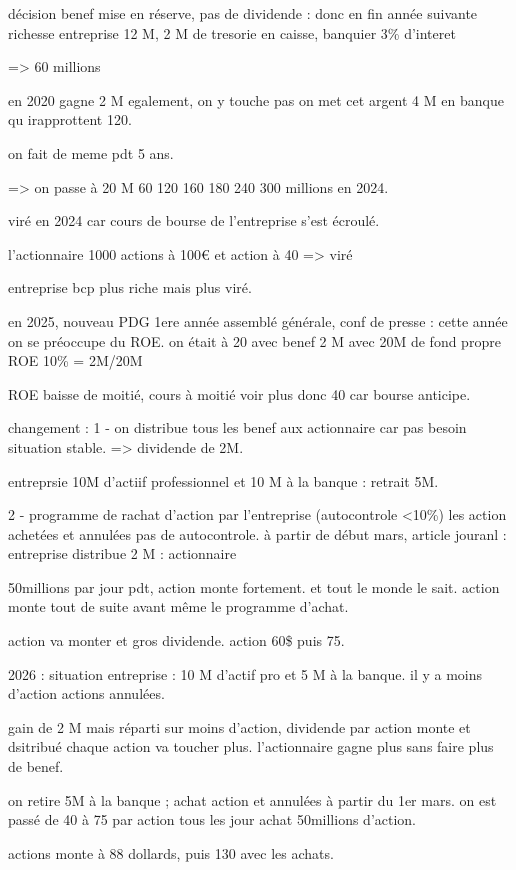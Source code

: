 \documentclass[a4paper,12pt]{article}
\begin{document}
décision benef mise en réserve, pas de dividende : donc en fin année suivante richesse
entreprise 12 M, 2 M de tresorie en caisse, banquier 3\% d'interet

=> 60 millions 

en 2020 gagne 2 M egalement, on y touche pas 
on met cet argent  4 M en banque qu irapprottent 120.

on fait de meme pdt 5 ans.

=> on passe à 20 M 60 120 160 180 240 300 millions en 2024.

viré en 2024 car cours de bourse de l'entreprise s'est écroulé.

l'actionnaire 1000 actions à 100€ et action à 40 => viré

entreprise bcp plus riche mais plus viré.

en 2025, nouveau PDG 1ere année
assemblé générale, conf de presse : cette année on se préoccupe du ROE.
on était à 20  avec benef 2 M avec 20M de fond propre  ROE 10\% = 2M/20M

ROE baisse de moitié, cours à moitié voir plus donc 40 car bourse anticipe.

changement : 1 - on distribue tous les benef aux actionnaire car pas besoin situation stable.
=> dividende de 2M.

entreprsie 10M d'actiif professionnel et 10 M à la banque : retrait 5M.

2 - programme de rachat d'action par l'entreprise  (autocontrole <10\%)
les action achetées et annulées pas de autocontrole. 
à partir de début mars, 
article jouranl : entreprise distribue 2 M : actionnaire 

50millions par jour pdt, action monte fortement. et tout le monde le sait.
action monte tout de suite avant même le programme d'achat.

action va monter et gros dividende.
action 60\$ puis 75.

2026 : situation entreprise : 10 M d'actif pro et 5 M à la banque.
il y a moins d'action actions annulées.

gain de 2 M mais réparti sur moins d'action, dividende par action monte et dsitribué
chaque action va toucher plus. l'actionnaire gagne plus sans faire plus de benef.

on retire 5M à la banque ; achat action et annulées à partir du 1er mars.
on est passé de 40 à 75 par action tous les jour achat 50millions d'action.

actions monte à 88 dollards, puis 130 avec les achats.
\end{document}
